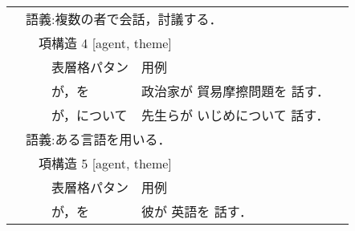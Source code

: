 \begin{table}[tbp]
\begin{center}
\begin{tabular}{||llll|ll||}
\multicolumn{1}{||l}{} & \multicolumn{4}{l}{語義:複数の者で会話，討議する．} &  \\
\multicolumn{1}{||l}{} & \multicolumn{1}{l}{} & \multicolumn{3}{l}{項構造 4 [agent, theme]} &  \\
\multicolumn{1}{||l}{} & \multicolumn{1}{l}{} &  & 表層格パタン & 用例 &  \\\cline{4-5}
\multicolumn{1}{||l}{} & \multicolumn{1}{l}{} & \multicolumn{1}{l}{} & が，を & 政治家が 貿易摩擦問題を 話す． &  \\
\multicolumn{1}{||l}{} & \multicolumn{1}{l}{} & \multicolumn{1}{l}{} & が，について & 先生らが いじめについて 話す．  &  \\
\multicolumn{1}{||l}{} & \multicolumn{4}{l}{語義:ある言語を用いる．} &  \\
\multicolumn{1}{||l}{} & \multicolumn{1}{l}{} & \multicolumn{3}{l}{項構造 5 [agent, theme]} &  \\
\multicolumn{1}{||l}{} & \multicolumn{1}{l}{} &  & 表層格パタン & 用例 &  \\\cline{4-5}
\multicolumn{1}{||l}{} & \multicolumn{1}{l}{} &  & が，を & 彼が 英語を 話す． &  \\\hline \hline
\end{tabular}
\label{tab:arg_dic_2}
\end{center}
\end{table}


